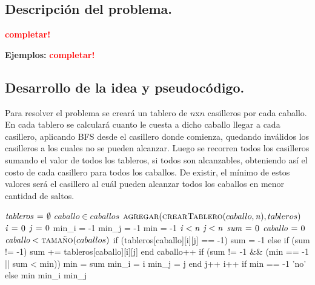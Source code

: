 \subsection{Descripción del problema.}

\vspace*{0.3cm}

\textcolor{red}{\textbf{completar!}}

\vspace*{0.5cm}

\textbf{Ejemplos:}
  \textcolor{red}{\textbf{completar!}}



\newpage
\subsection{Desarrollo de la idea y pseudocódigo.}

\vspace*{0.3cm}


Para resolver el problema se creará un tablero de $n$x$n$ casilleros por cada
caballo.
En cada tablero se calculará cuanto le cuesta a dicho caballo llegar a cada casillero,
aplicando BFS desde el casillero donde comienza, quedando inválidos los casilleros
a los cuales no se pueden alcanzar.
Luego se recorren todos los casilleros sumando el valor de todos los tableros, si
todos son alcanzables, obteniendo así el costo de cada casillero para todos los caballos.
De existir, el mínimo de estos valores será el casillero al cuál pueden alcanzar todos 
los caballos en menor cantidad de saltos.

\begin{codebox}
\li $\id{tableros} \gets \emptyset$
\li \For $caballo \in caballos$
\li   \Do
\li     $\proc{agregar}(\proc{crearTablero}(caballo, \id{n}), tableros)$
      \End
\li $\id{i} \gets 0$
\li $\id{j} \gets 0$
    min_i = -1
    min_j = -1
    min = -1
\li \While $\id{i} < \id{n}$
\li   \Do
\li     \While $\id{j} < \id{n}$
\li       \Do
\li         $\id{sum} \gets 0$
\li         $\id{caballo} \gets 0$
\li         \While $\id{caballo} < \proc{tamaño}(caballos)$
\li           \Do
                if (tableros[caballo][i][j] == -1)
                  sum = -1
                else if (sum != -1)
                  sum += tableros[caballo][i][j]
                end
                caballo++
              \End
            if (sum != -1 && (min == -1 || sum < min))
              min = sum
              min_i = i
              min_j = j
            end
            j++
        \End
        i++
      \End
    if min == -1
      \Return 'no'
    else
\li \Return min min_i min_j
\end{codebox}


